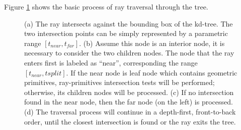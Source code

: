 Figure \ref{fig:kd-tree_traversal} shows the basic process of ray traversal through the tree. 
\begin{figure}[hpt]
	\centering
	\renewcommand{\thefigure}{\thechapter.\arabic{figure}}
	\caption[Traversal of Ray Through the KD-Tree.]{(a) The ray intersects against the bounding box of the kd-tree. The two intersection points can be simply represented by a parametric range \([t_{near}, t_{far}]\). (b) Assume this node is an interior node, it is necessary to consider the two children nodes. The node that the ray enters first is labeled as ``near'', corresponding the range \([t_{near}, t{split}]\). If the near node is leaf node which contains geometric primitives, ray-primitives intersection tests will be performed; otherwise, its children nodes will be processed. (c) If no intersection found in the near node, then the far node (on the left) is processed. (d) The traversal process will continue in a depth-first, front-to-back order, until the closest intersection is found or the ray exits the tree.	
	} %
	\label{fig:kd-tree_traversal}	%
\end{figure}


